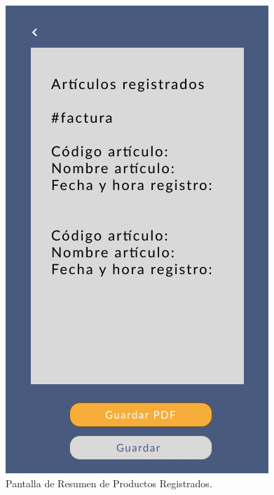 \documentclass{scrreprt}
\begin{document}
    \begin{figure}[!htpb]
        \centerline{\includegraphics[scale=.35]{images/prototype/mobile/iPhone 8 - 7.png}}
        \caption{Pantalla de Resumen de Productos Registrados.}
        \label{fig}
    \end{figure}
    \FloatBarrier
\end{document}
